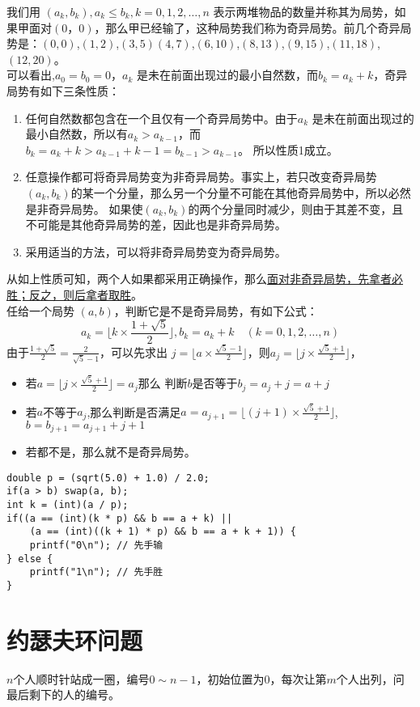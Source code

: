我们用 $(a_k,b_k),a_k\leq b_k,k=0,1,2,…,n$ 表示两堆物品的数量并称其为局势，如果甲面对$(0，0)$，那么甲已经输了，这种局势我们称为奇异局势。前几个奇异局势是：$(0,0)$,$(1,2)$,$(3,5)$$(4,7)$,$(6,10)$,$(8,13)$,$(9,15)$,$(11,18)$,$(12,20)$。 \\
可以看出,$a_0=b_0=0$，$a_k$ 是未在前面出现过的最小自然数，而$b_k=a_k+k$，奇异局势有如下三条性质：
\begin{enumerate}
\item 任何自然数都包含在一个且仅有一个奇异局势中。由于$a_k$ 是未在前面出现过的最小自然数，所以有$a_k>a_{k−1}$，而 $b_k=a_k+k>a_{k−1}+k−1=b_{k−1}>a_{k−1}$。 所以性质1成立。
\item 任意操作都可将奇异局势变为非奇异局势。事实上，若只改变奇异局势$(a_k,b_k)$的某一个分量，那么另一个分量不可能在其他奇异局势中，所以必然是非奇异局势。 如果使$(a_k,b_k)$的两个分量同时减少，则由于其差不变，且不可能是其他奇异局势的差，因此也是非奇异局势。
\item 采用适当的方法，可以将非奇异局势变为奇异局势。
\end{enumerate}
从如上性质可知，两个人如果都采用正确操作，那么\underline{面对非奇异局势，先拿者必胜；反之，则后拿者取胜}。 \\
任给一个局势 $(a,b)$，判断它是不是奇异局势，有如下公式： \\
$$a_k=\lfloor k\times \frac{1+\sqrt{5}}{2}\rfloor,b_k=a_k+k\quad (k=0,1,2,…,n)$$
由于$\frac{1+\sqrt{5}}{2}=\frac{2}{\sqrt{5} - 1}$，可以先求出 $j=\lfloor a\times \frac{\sqrt{5}-1}{2}\rfloor$，则$a_j=\lfloor j \times \frac{\sqrt{5}+1}{2}\rfloor$，
\begin{itemize}
\item 若$a=\lfloor j \times \frac{\sqrt{5}+1}{2}\rfloor=a_j$那么 判断$b$是否等于$b_j=a_j+j=a+j$
\item 若$a$不等于$a_j$,那么判断是否满足$a=a_{j+1}=\lfloor (j+1) \times \frac{\sqrt{5}+1}{2}\rfloor$,$b=b_{j+1}=a_{j+1}+j+1$
\item 若都不是，那么就不是奇异局势。
\end{itemize}

\begin{lstlisting}
double p = (sqrt(5.0) + 1.0) / 2.0;
if(a > b) swap(a, b);
int k = (int)(a / p);
if((a == (int)(k * p) && b == a + k) ||
	(a == (int)((k + 1) * p) && b == a + k + 1)) {
	printf("0\n"); // 先手输
} else {
	printf("1\n"); // 先手胜
}
\end{lstlisting}

\clearpage
\section{约瑟夫环问题}
$n$个人顺时针站成一圈，编号$0\sim n-1$，初始位置为0，每次让第$m$个人出列，问最后剩下的人的编号。 \\

